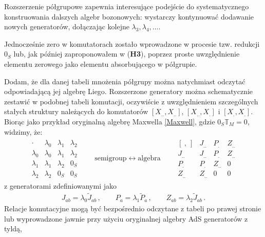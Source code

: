 \documentclass[12pt,a4paper]{article}
\begin{document}
Rozszerzenie półgrupowe zapewnia interesujące podejście do systematycznego konstruowania dalszych algebr bozonowych: wystarczy kontynuować dodawanie nowych generatorów, dołączając kolejne $\lambda_3, \lambda_4, \ldots$.

Jednocześnie zero w komutatorach zostało wprowadzone w procesie tzw. redukcji $0_S$ \cite{Izaurieta:2006zz, Salgado:2013eut} lub, jak później zaproponowałem w (\textbf{H3}), poprzez proste uwzględnienie elementu zerowego jako elementu absorbującego w półgrupie.

Dodam, że dla danej tabeli mnożenia półgrupy można natychmiast odczytać odpowiadającą jej algebrę Liego. Rozszerzone generatory można schematycznie zestawić w podobnej tabeli komutacji, oczywiście z uwzględnieniem szczególnych stałych struktury należących do komutatorów $\left[X_{..}, X_{..}\right]$, $\left[X_{..}, X_{.}\right]$ i $\left[X_{.}, X_{.}\right]$. Biorąc jako przykład oryginalną algebrę Maxwella \eqref{Maxwell}, gdzie $0_S\mathbb{T}_M=0$, widzimy, że:
\begin{align}
	\begin{array}{c|ccc}
		\cdot & \lambda_0 & \lambda_1 & \lambda_2 \\
		\hline
		\lambda_0 & \lambda_0 & \lambda_1 & \lambda_2 \\
		\lambda_1 & \lambda_1 & \lambda_2 & 0_S \\
		\lambda_2 & \lambda_2 & 0_S & 0_S
	\end{array}
	\qquad
	\text{semigroup} \leftrightarrow \text{algebra}
	\qquad
	\begin{array}{c|ccc}
		\left[~,~\right] & J_{..} & P_{.} & Z_{..} \\
		\hline
		J_{..} & J_{..} & P_{.} & Z_{..} \\
		P_{.}  & P_{.} & Z_{..} & 0 \\
		Z_{..} & Z_{..} & 0 & 0
	\end{array}
\end{align}
z generatorami zdefiniowanymi jako
\begin{align}
	J_{ab}=\lambda_0\tilde{J}_{ab}\,,\qquad P_{a}=\lambda_1\tilde{P}_a\,,\qquad Z_{ab}=\lambda_2\tilde{J}_{ab}\,.
\end{align}
Relacje komutacyjne mogą być bezpośrednio odczytane z tabeli po prawej stronie lub wyprowadzone jawnie przy użyciu oryginalnej algebry AdS generatorów z tyldą,
\end{document}
